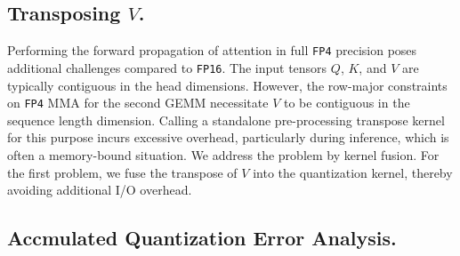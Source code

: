 \begin{table}[H]
\centering
\caption{Comparison of \texttt{SageBwd} and \texttt{BF16} performance on MMLU and HellaSwag across different seeds on \llamal(3B).}
\label{tab:seed_llama_2}
\end{table}


\subsection{Transposing $V$.}  \label{sec:appendix_others}

Performing the forward propagation of attention in full \texttt{FP4} precision poses additional challenges compared to \texttt{FP16}.
The input tensors $Q$, $K$, and $V$ are typically contiguous in the head dimensions. However, the row-major constraints on \texttt{FP4} MMA for the second GEMM necessitate $V$ to be contiguous in the sequence length dimension. Calling a standalone pre-processing transpose kernel for this purpose incurs excessive overhead, particularly during inference, which is often a memory-bound situation.
We address the problem by kernel fusion. For the first problem, we fuse the transpose of $V$ into the quantization kernel, thereby avoiding additional I/O overhead. 

\subsection{Accmulated Quantization Error Analysis.} 


